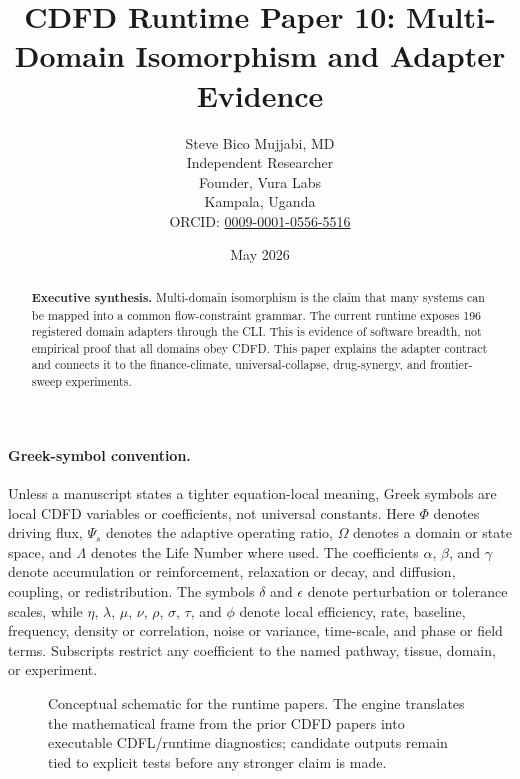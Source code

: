 \documentclass[12pt,a4paper]{article}
\title{\textbf{CDFD Runtime Paper 10: Multi-Domain Isomorphism and Adapter Evidence}}
\author{Steve Bico Mujjabi, MD\\
\small Independent Researcher\\
\small Founder, Vura Labs\\
\small Kampala, Uganda\\
\small ORCID: \href{https://orcid.org/0009-0001-0556-5516}{0009-0001-0556-5516}}
\date{May 2026}
\begin{document}
\maketitle

\begin{abstract}
\noindent \textbf{Executive synthesis.} Multi-domain isomorphism is the claim
that many systems can be mapped into a common flow-constraint grammar. The
current runtime exposes 196 registered domain adapters through the CLI. This is
evidence of software breadth, not empirical proof that all domains obey CDFD.
This paper explains the adapter contract and connects it to the finance-climate,
universal-collapse, drug-synergy, and frontier-sweep experiments.
\end{abstract}

\paragraph{Greek-symbol convention.}
Unless a manuscript states a tighter equation-local meaning, Greek symbols are local CDFD variables or coefficients, not universal constants. Here $\Phi$ denotes driving flux, $\Psi_s$ denotes the adaptive operating ratio, $\Omega$ denotes a domain or state space, and $\Lambda$ denotes the Life Number where used. The coefficients $\alpha$, $\beta$, and $\gamma$ denote accumulation or reinforcement, relaxation or decay, and diffusion, coupling, or redistribution. The symbols $\delta$ and $\epsilon$ denote perturbation or tolerance scales, while $\eta$, $\lambda$, $\mu$, $\nu$, $\rho$, $\sigma$, $\tau$, and $\phi$ denote local efficiency, rate, baseline, frequency, density or correlation, noise or variance, time-scale, and phase or field terms. Subscripts restrict any coefficient to the named pathway, tissue, domain, or experiment.


\begin{figure}[ht]
\centering
{}
\caption{Conceptual schematic for the runtime papers. The engine translates the mathematical frame from the prior CDFD papers into executable CDFL/runtime diagnostics; candidate outputs remain tied to explicit tests before any stronger claim is made.}
\end{figure}
\end{document}
